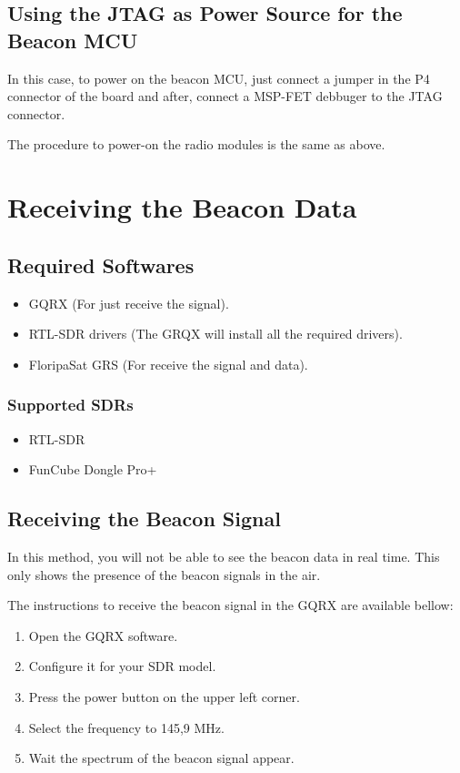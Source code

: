 \subsection{Using the JTAG as Power Source for the Beacon MCU}

In this case, to power on the beacon MCU, just connect a jumper in the P4 connector of the board and after, connect a MSP-FET debbuger to the JTAG connector.

The procedure to power-on the radio modules is the same as above.

\section{Receiving the Beacon Data}

\subsection{Required Softwares}

\begin{itemize}
    \item GQRX (For just receive the signal).
    \item RTL-SDR drivers (The GRQX will install all the required drivers).
    \item FloripaSat GRS (For receive the signal and data).
\end{itemize}

\subsubsection{Supported SDRs}

\begin{itemize}
    \item RTL-SDR
    \item FunCube Dongle Pro+
\end{itemize}

\subsection{Receiving the Beacon Signal}

In this method, you will not be able to see the beacon data in real time. This only shows the presence of the beacon signals in the air.

The instructions to receive the beacon signal in the GQRX are available bellow:

\begin{enumerate}
    \item Open the GQRX software.
    \item Configure it for your SDR model.
    \item Press the power button on the upper left corner.
    \item Select the frequency to 145,9 MHz.
    \item Wait the spectrum of the beacon signal appear.
\end{enumerate}

